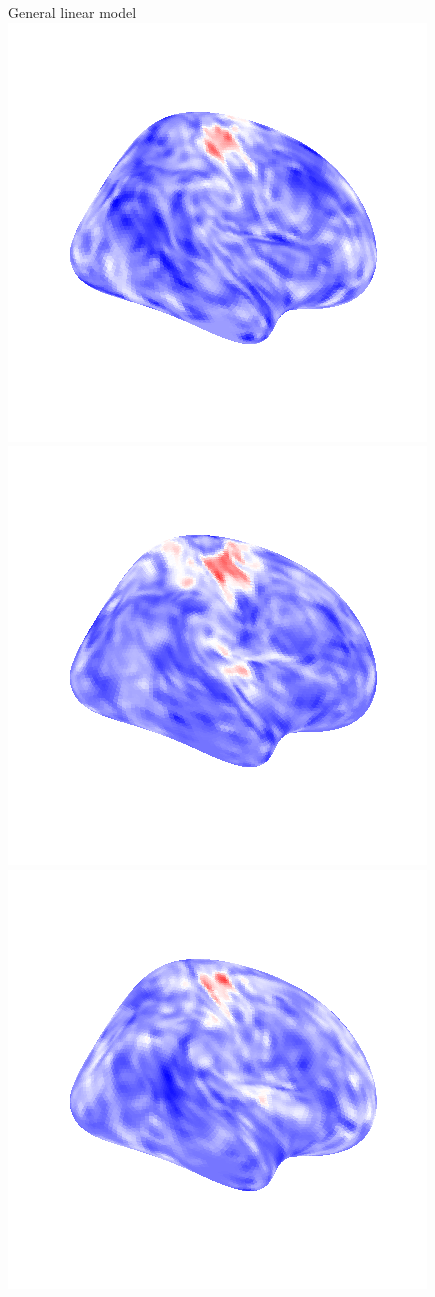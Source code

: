 \documentclass[bigger]{beamer}
\begin{document}
\begin{frame}{General linear model}
  \includegraphics[scale=0.20]{python/lr_button_0.png}
  \includegraphics[scale=0.20]{python/lr_button_1.png}
  \includegraphics[scale=0.20]{python/lr_button_2.png}

\end{frame}
\end{document}
